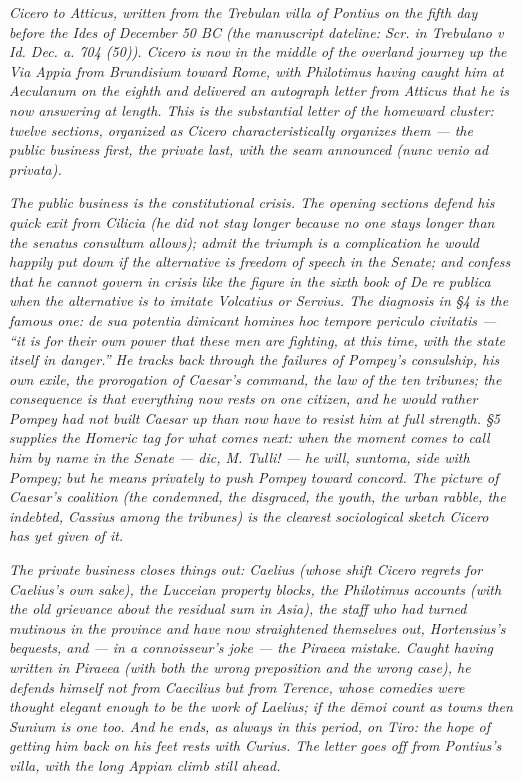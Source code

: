 
\textit{Cicero to Atticus, written from the Trebulan villa of
Pontius on the fifth day before the Ides of December 50 BC
(the manuscript dateline: \textit{Scr. in Trebulano v Id. Dec.
a. 704 (50)}). Cicero is now in the middle of the overland
journey up the Via Appia from Brundisium toward Rome, with
Philotimus having caught him at Aeculanum on the eighth and
delivered an autograph letter from Atticus that he is now
answering at length. This is the substantial letter of the
homeward cluster: twelve sections, organized as Cicero
characteristically organizes them --- the public business
first, the private last, with the seam announced
(\emph{nunc venio ad privata}).}

\textit{The public business is the constitutional crisis. The
opening sections defend his quick exit from Cilicia (he did
not stay longer because no one stays longer than the senatus
consultum allows); admit the triumph is a complication he
would happily put down if the alternative is freedom of
speech in the Senate; and confess that he cannot govern in
crisis like the figure in the sixth book of \emph{De re
publica} when the alternative is to imitate Volcatius or
Servius. The diagnosis in \S 4 is the famous one: \emph{de
sua potentia dimicant homines hoc tempore periculo civitatis}
--- ``it is for their own power that these men are fighting,
at this time, with the state itself in danger.'' He tracks
back through the failures of Pompey's consulship, his own
exile, the prorogation of Caesar's command, the law of the
ten tribunes; the consequence is that everything now rests
on one citizen, and he would rather Pompey had not built
Caesar up than now have to resist him at full strength.
\S 5 supplies the Homeric tag for what comes next: when the
moment comes to call him by name in the Senate ---
\emph{dic, M. Tulli!} --- he will, \emph{suntoma}, side with
Pompey; but he means privately to push Pompey toward concord.
The picture of Caesar's coalition (the condemned, the
disgraced, the youth, the urban rabble, the indebted, Cassius
among the tribunes) is the clearest sociological sketch
Cicero has yet given of it.}

\textit{The private business closes things out: Caelius
(whose shift Cicero regrets for Caelius's own sake), the
Lucceian property blocks, the Philotimus accounts (with the
old grievance about the residual sum in Asia), the staff
who had turned mutinous in the province and have now
straightened themselves out, Hortensius's bequests, and ---
in a connoisseur's joke --- the \emph{Piraeea} mistake.
Caught having written \emph{in Piraeea} (with both the
wrong preposition and the wrong case), he defends himself
not from Caecilius but from Terence, whose comedies were
thought elegant enough to be the work of Laelius; if the
\emph{dēmoi} count as towns then Sunium is one too. And he
ends, as always in this period, on Tiro: the hope of getting
him back on his feet rests with Curius. The letter goes off
from Pontius's villa, with the long Appian climb still
ahead.}
